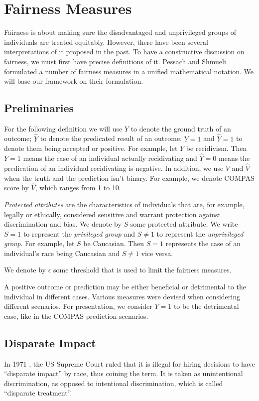 \documentclass[conference]{IEEEtran}
\begin{document}
\section{Fairness Measures}
\label{sec:measures}
Fairness is about making sure the disadvantaged and unprivileged groups of individuals are treated equitably. However, there have been several interpretations of it proposed in the past. To have a constructive discussion on fairness, we must first have precise definitions of it. Pessach and Shmueli \cite{pessach2022review} formulated a number of fairness measures in a unified mathematical notation. We will base our framework on their formulation.

\subsection{Preliminaries}
For the following definition we will use $Y$ to denote the ground truth of an outcome; $\hat{Y}$ to denote the predicated result of an outcome; $Y = 1$ and $\hat{Y} = 1$ to denote them being accepted or positive. For example, let $Y$ be recidivism. Then $Y = 1$ means the case of an individual actually recidivating and $\hat{Y} = 0$ means the predication of an individual recidivating is negative. In addition, we use $V$ and $\hat{V}$ when the truth and the prediction isn't binary. For example, we denote COMPAS score by $\hat{V}$, which ranges from 1 to 10.

\emph{Protected attributes} are the characteristics of individuals that are, for example, legally or ethically, considered sensitive and warrant protection against discrimination and bias. We denote by $S$ some protected attribute. We write $S = 1$ to represent the \emph{privileged group} and $S \neq 1$ to represent the \emph{unprivileged group}. For example, let $S$ be Caucasian. Then $S = 1$ represents the case of an individual's race being Caucasian and $S \neq 1$ vice versa.

We denote by $\epsilon$ some threshold that is used to limit the fairness measures.

A positive outcome or prediction may be either beneficial or detrimental to the individual in different cases. Various measures were devised when considering different scenarios. For presentation, we consider $Y=1$ to be the detrimental case, like in the COMPAS prediction scenarios.

\subsection{Disparate Impact}
In 1971 \cite{griggs1971}, the US Supreme Court ruled that it is illegal for hiring decisions to have  ``disparate impact'' by race, thus coining the term. It is taken as unintentional discrimination, as opposed to intentional discrimination, which is called ``disparate treatment''.
\end{document}
